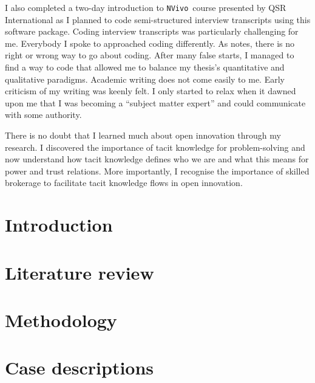 \documentclass[12pt,table,xcdraw]{book}
\begin{document}
I also completed a two-day introduction to \texttt{NVivo}\texttrademark\ course presented by QSR International as I planned to code semi-structured interview transcripts using this software package. Coding interview transcripts was particularly challenging for me. Everybody I spoke to approached coding differently. As \citet{saldana2015coding} notes, there is no right or wrong way to go about coding. After many false starts, I managed to find a way to code that allowed me to balance my thesis's quantitative and qualitative paradigms. Academic writing does not come easily to me. Early criticism of my writing was keenly felt. I only started to relax when it dawned upon me that I was becoming a \enquote{subject matter expert} and could communicate with some authority. \medskip

There is no doubt that I learned much about open innovation through my research. I discovered the importance of tacit knowledge for problem-solving and now understand how tacit knowledge defines who we are and what this means for power and trust relations. More importantly, I recognise the importance of skilled brokerage to facilitate tacit knowledge flows in open innovation. 

\newpage
\setcounter{tocdepth}{3}
\tableofcontents

\newpage

\listoffigures

\newpage

\listoftables

\mainmatter

\chapter{Introduction} \label{chp:intro}


\chapter{Literature review} \label{chp:lit_review}


\chapter{Methodology} \label{chp:methodology}


\chapter{Case descriptions} \label{chp:case_overview}

\end{document}
